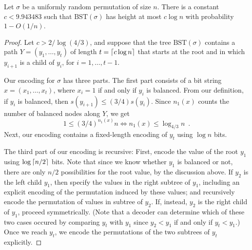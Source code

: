 \documentclass[prodmode,acmcsur]{acmsmall}
\begin{document}
\begin{thm}
  Let $\sigma$ be a uniformly random permutation of size $n$. 
  There is a constant $c < 9.943483$ such that 
  $\text{BST}(\sigma)$ has height at most $c\log n$ with probability
  $1 - O(1/n)$.
\end{thm}
\begin{proof}
  Let $c > 2/\log (4/3)$,
  and suppose that the tree $\text{BST}(\sigma)$ contains a path
  $Y = (y_1, \ldots, y_t)$ of length $t = {\lceil c \log n \rceil}$ that
  starts at the root and in which $y_{i+1}$ is a child of $y_i$,
  for $i = 1, \dots, t-1$.

  Our encoding for $\sigma$ has three parts. 
  The first part consists of
  a bit string
  $x = (x_1, \dots, x_t)$, where $x_i = 1$ if and only if $y_i$ is
  balanced. From our definition, if $y_i$ is balanced, then
  $s(y_{i + 1}) \leq (3/4) s(y_i)$. Since $n_1(x)$ counts the
  number of balanced nodes along $Y$, we get
  \[
    1 \leq (3/4)^{n_1(x)} n \iff n_1(x) \leq \log_{4/3} n \enspace .
  \]
  Next, our encoding contains a fixed-length encoding of $y_t$ using
  $\log n$ bits.

  The third part of our encoding is recursive: First, encode the value of
  the root $y_1$ using $\log {\lceil n/2 \rceil}$ bits. Note that since we know
  whether $y_1$ is balanced or not, there are only $n/2$ possibilities
  for the root value, by the discussion above.  If $y_2$ is the left child
  $y_1$, then specify the values in the right subtree of $y_1$, including
  an explicit encoding of the permutation induced by these values; and
  recursively encode the permutation of values in subtree of $y_2$. If,
  instead, $y_2$ is the right child of  $y_1$, proceed symmetrically.
  (Note that a decoder can determine which of these two cases occured by
  comparing $y_t$ with $y_1$ since $y_2 <y_1$ if and only if $y_t< y_1$.)
  Once we reach $y_t$, we encode the permutations of the two subtrees
  of $y_t$ explicitly.
 

\end{proof}
\end{document}
